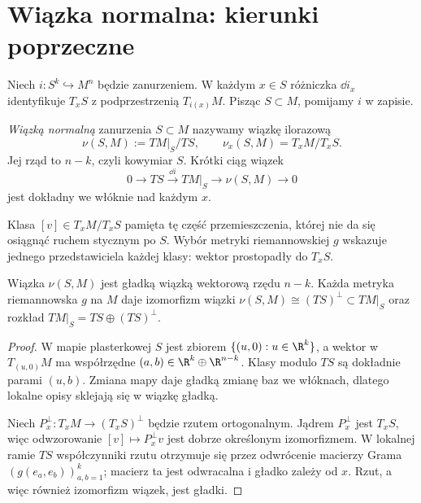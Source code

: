 \section{Wiązka normalna: kierunki poprzeczne}
\label{sec:wiazka-normalna}

Niech $i:S^k\hookrightarrow M^n$ będzie
zanurzeniem. W każdym $x\in S$ różniczka
$\dd i_x$ identyfikuje $T_xS$ z
podprzestrzenią $T_{i(x)}M$.
Pisząc $S\subset M$, pomijamy $i$ w zapisie.

\begin{definicja}
\label{def:wiazka-normalna-15}
\emph{Wiązką normalną} zanurzenia $S\subset M$
nazywamy wiązkę ilorazową
\[
 \nu(S,M):=TM|_S/TS,\qquad
 \nu_x(S,M)=T_xM/T_xS.
\]
Jej rząd to $n-k$, czyli kowymiar $S$.
Krótki ciąg wiązek
\begin{equation}\label{eq:normalny-ciag}
 0\longrightarrow TS
 \stackrel{\dd i}{\longrightarrow}TM|_S
 \longrightarrow\nu(S,M)\longrightarrow0
\end{equation}
jest dokładny we włóknie nad każdym $x$.
\end{definicja}

Klasa $[v]\in T_xM/T_xS$ pamięta tę część
przemieszczenia, której nie da się osiągnąć
ruchem stycznym po $S$. Wybór metryki
riemannowskiej $g$ wskazuje jednego
przedstawiciela każdej klasy: wektor
prostopadły do $T_xS$.

\begin{stwierdzenie}
\label{prop:normalna-rozszczepienie}
Wiązka $\nu(S,M)$ jest gładką wiązką
wektorową rzędu $n-k$. Każda metryka
riemannowska $g$ na $M$ daje izomorfizm
wiązki $\nu(S,M)\cong(TS)^\perp\subset TM|_S$
oraz rozkład $TM|_S=TS\oplus(TS)^\perp$.
\end{stwierdzenie}
\begin{proof}
W mapie plasterkowej $S$ jest zbiorem
$\{(u,0):u\in\R^k\}$, a wektor w $T_{(u,0)}M$
ma współrzędne $(a,b)\in\R^k\oplus\R^{n-k}$.
Klasy modulo $TS$ są dokładnie parami
$(u,b)$. Zmiana mapy daje gładką zmianę
baz we włóknach, dlatego lokalne opisy
sklejają się w wiązkę gładką.

Niech $P^\perp_x:T_xM\to(T_xS)^\perp$
będzie rzutem ortogonalnym.
Jądrem $P^\perp_x$ jest $T_xS$, więc
odwzorowanie $[v]\mapsto P^\perp_xv$ jest
dobrze określonym izomorfizmem.
W lokalnej ramie $TS$ współczynniki
rzutu otrzymuje się przez odwrócenie
macierzy Grama
$(g(e_a,e_b))_{a,b=1}^k$;
macierz ta jest odwracalna i gładko
zależy od $x$. Rzut, a więc również
izomorfizm wiązek, jest gładki.
\end{proof}

